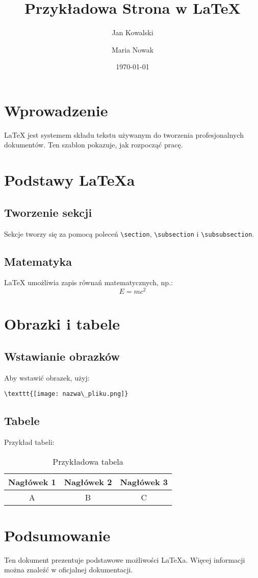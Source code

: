 \documentclass[a4paper,12pt]{article}
\title{Przykładowa Strona w LaTeX}
\author{Jan Kowalski \and Maria Nowak}
\date{\today}
\begin{document}
\maketitle
\newpage

\tableofcontents
\newpage

\section{Wprowadzenie}
LaTeX jest systemem składu tekstu używanym do tworzenia profesjonalnych dokumentów. Ten szablon pokazuje, jak rozpocząć pracę.

\section{Podstawy LaTeXa}
\subsection{Tworzenie sekcji}
Sekcje tworzy się za pomocą poleceń \texttt{\textbackslash section}, \texttt{\textbackslash subsection} i \texttt{\textbackslash subsubsection}. 

\subsection{Matematyka}
LaTeX umożliwia zapis równań matematycznych, np.:
\begin{equation}
E = mc^2
\end{equation}

\section{Obrazki i tabele}
\subsection{Wstawianie obrazków}
Aby wstawić obrazek, użyj:\newline
\begin{verbatim}
\texttt{[image: nazwa\_pliku.png]}
\end{verbatim}

\subsection{Tabele}
Przykład tabeli:
\begin{table}[h!]
    \centering
    \begin{tabular}{|c|c|c|}
        \hline
        Nagłówek 1 & Nagłówek 2 & Nagłówek 3 \\
        \hline
        A          & B          & C          \\
        \hline
    \end{tabular}
    \caption{Przykładowa tabela}
    \label{tab:example}
\end{table}

\section{Podsumowanie}
Ten dokument prezentuje podstawowe możliwości LaTeXa. Więcej informacji można znaleźć w oficjalnej dokumentacji.
\end{document}
